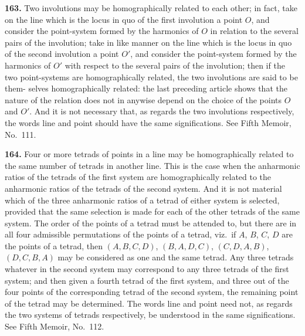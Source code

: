 \documentclass[11pt,a4paper]{article}
\begin{document}
\textbf{163.} Two involutions may be homographically related to each other; in fact,
take on the line which is the locus in quo of the first involution a point $O$, and
consider the point-system formed by the harmonics of $O$ in relation to the several
pairs of the involution; take in like manner on the line which is the locus in quo
of the second involution a point $O'$, and consider the point-system formed by the
harmonics of $O'$ with respect to the several pairs of the involution; then if the two
point-systems are homographically related, the two involutions are said to be them-
selves homographically related: the last preceding article shows that the nature of
the relation does not in anywise depend on the choice of the points $O$ and $O'$.
And it is not necessary that, as regards the two involutions respectively, the words
line and point should have the same significations. See Fifth Memoir, No.~111.

\textbf{164.} Four or more tetrads of points in a line may be homographically related
to the same number of tetrads in another line. This is the case when the anharmonic
ratios of the tetrads of the first system are homographically related to the anharmonic
ratios of the tetrads of the second system. And it is not material which of the three
anharmonic ratios of a tetrad of either system is selected, provided that the same
selection is made for each of the other tetrads of the same system. The order of the
points of a tetrad must be attended to, but there are in all four admissible permutations
of the points of a tetrad, viz.\ if $A$, $B$, $C$, $D$ are the points of a tetrad, then $(A,B,C,D)$,
$(B,A,D,C)$, $(C,D,A,B)$, $(D,C,B,A)$ may be considered as one and the same tetrad.
Any three tetrads whatever in the second system may correspond to any three tetrads
of the first system; and then given a fourth tetrad of the first system, and three out
of the four points of the corresponding tetrad of the second system, the remaining
point of the tetrad may be determined. The words line and point need not, as regards
the two systems of tetrads respectively, be understood in the same significations.
See Fifth Memoir, No.~112.
\end{document}
